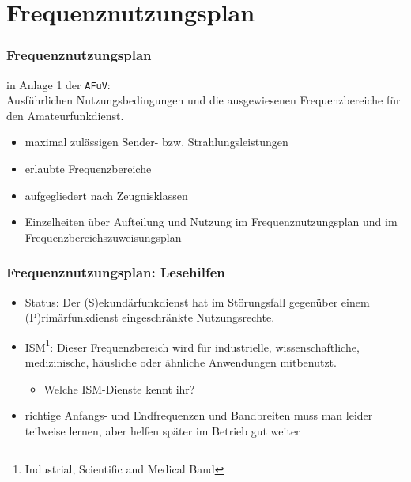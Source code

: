 \section[Frequenz\-nutzungs\-plan]{Frequenznutzungsplan}

\begin{frame}
    \frametitle{Frequenznutzungsplan}

    in Anlage 1 der \texttt{AFuV}\cite{afuv}: \\[1em]


    Ausführlichen Nutzungsbedingungen und die ausgewiesenen Frequenzbereiche für
    den Amateurfunkdienst.

    \begin{itemize}
        \item maximal zulässigen Sender- bzw. Strahlungsleistungen
        \item erlaubte Frequenzbereiche
        \item aufgegliedert nach Zeugnisklassen
        \item Einzelheiten über Aufteilung und Nutzung im
              Frequenznutzungsplan und im Frequenzbereichszuweisungsplan
    \end{itemize}
   
\end{frame}

\begin{frame}
    \frametitle{Frequenznutzungsplan: Lesehilfen}

    \begin{itemize}[<+->]
        \item Status: Der (S)ekundärfunkdienst hat im Störungsfall gegenüber einem
              (P)rimärfunkdienst eingeschränkte Nutzungsrechte.
        \item ISM\footnote{Industrial, Scientific and Medical Band}: Dieser
              Frequenzbereich wird für industrielle, wissenschaftliche,
              medizinische, häusliche oder ähnliche Anwendungen mitbenutzt.
        \begin{itemize}
            \item Welche ISM-Dienste kennt ihr?
        \end{itemize}
        \item richtige Anfangs- und Endfrequenzen und Bandbreiten muss man
              leider teilweise lernen, aber helfen später im Betrieb gut weiter
    \end{itemize}

\end{frame}

